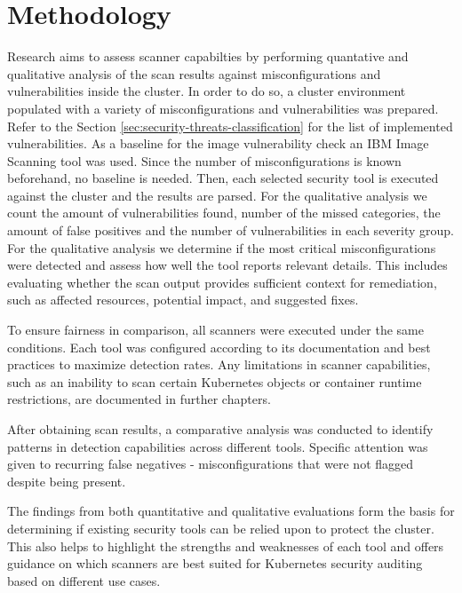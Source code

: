 \section{Methodology}
\label{sec:methodology}

Research aims to assess scanner capabilties by performing quantative and qualitative analysis of the scan results against misconfigurations and vulnerabilities inside the cluster. In order to do so, a cluster environment populated with a variety of misconfigurations and vulnerabilities was prepared. Refer to the Section \ref{sec:security-threats-classification} for the list of implemented vulnerabilities. As a baseline for the image vulnerability check an IBM Image Scanning tool was used. Since the number of misconfigurations is known beforehand, no baseline is needed. Then, each selected security tool is executed against the cluster and the results are parsed. For the qualitative analysis we count the amount of vulnerabilities found, number of the missed categories, the amount of false positives and the number of vulnerabilities in each severity group. For the qualitative analysis we determine if the most critical misconfigurations were detected and assess how well the tool reports relevant details. This includes evaluating whether the scan output provides sufficient context for remediation, such as affected resources, potential impact, and suggested fixes.

To ensure fairness in comparison, all scanners were executed under the same conditions. Each tool was configured according to its documentation and best practices to maximize detection rates. Any limitations in scanner capabilities, such as an inability to scan certain Kubernetes objects or container runtime restrictions, are documented in further chapters.

After obtaining scan results, a comparative analysis was conducted to identify patterns in detection capabilities across different tools. Specific attention was given to recurring false negatives - misconfigurations that were not flagged despite being present.

The findings from both quantitative and qualitative evaluations form the basis for determining if existing security tools can be relied upon to protect the cluster. This also helps to highlight the strengths and weaknesses of each tool and offers guidance on which scanners are best suited for Kubernetes security auditing based on different use cases.